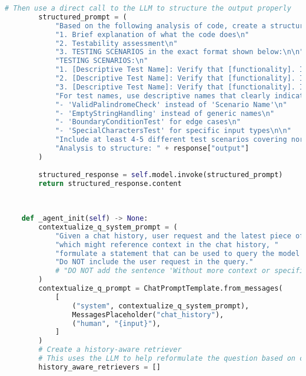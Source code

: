 \begin{lstlisting}[language=Python, caption={$\texttt{AI\_Agent}$ class.}, label={lst:12}]
        # Then use a direct call to the LLM to structure the output properly
        structured_prompt = (
            "Based on the following analysis of code, create a structured response with the following sections:\n"
            "1. Brief explanation of what the code does\n"
            "2. Testability assessment\n"
            "3. TESTING SCENARIOS in the exact format shown below:\n\n"
            "TESTING SCENARIOS:\n"
            "1. [Descriptive Test Name]: Verify that [functionality]. Input: [specific input values]. Expected: [specific output/behavior].\n"
            "2. [Descriptive Test Name]: Verify that [functionality]. Input: [specific input values]. Expected: [specific output/behavior].\n"
            "3. [Descriptive Test Name]: Verify that [functionality]. Input: [specific input values]. Expected: [specific output/behavior].\n\n"
            "For test names, use descriptive names that clearly indicate the purpose of the test, such as:\n"
            "- 'ValidPalindromeCheck' instead of 'Scenario Name'\n"
            "- 'EmptyStringHandling' instead of generic names\n"
            "- 'BoundaryConditionTest' for edge cases\n"
            "- 'SpecialCharactersTest' for specific input types\n\n"
            "Include at least 4-5 different test scenarios covering normal cases, edge cases, and special conditions.\n"
            "Analysis to structure: " + response["output"]
        )
        
        structured_response = self.model.invoke(structured_prompt)
        return structured_response.content
            
        
        
    def _agent_init(self) -> None:
        contextualize_q_system_prompt = (
            "Given a chat history, user request and the latest piece of user source code, "
            "which might reference context in the chat history, "
            "formulate a statement that can be used to query the model for useful reference."
            "Do NOT include the user request in the query."
            # "DO NOT add the sentence 'Without more context or specific questions about the code, I can't provide a more detailed explanation' in the answer."
        )
        contextualize_q_prompt = ChatPromptTemplate.from_messages(
            [
                ("system", contextualize_q_system_prompt),
                MessagesPlaceholder("chat_history"),
                ("human", "{input}"),
            ]
        )
        # Create a history-aware retriever
        # This uses the LLM to help reformulate the question based on chat history
        history_aware_retrievers = [] 
        

\end{lstlisting}
